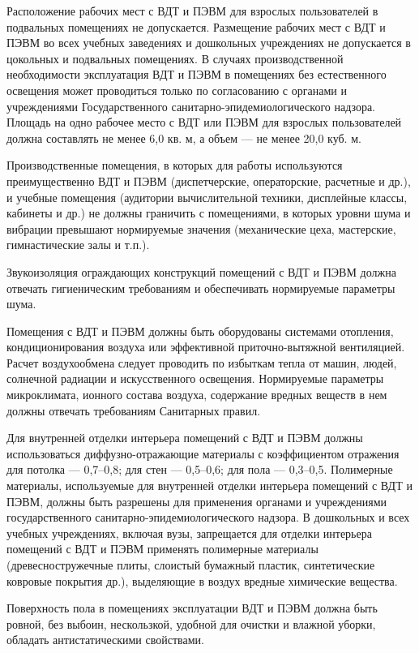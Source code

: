 Расположение рабочих мест с ВДТ и ПЭВМ для взрослых пользователей в подвальных помещениях не допускается. Размещение рабочих мест с ВДТ и ПЭВМ во всех учебных заведениях и дошкольных учреждениях не допускается в цокольных и подвальных помещениях. В случаях производственной необходимости эксплуатация ВДТ и ПЭВМ в помещениях без естественного освещения может проводиться только по согласованию с органами и учреждениями Государственного санитарно-эпидемиологического надзора.
Площадь на одно рабочее место с ВДТ или ПЭВМ для взрослых пользователей должна составлять не менее 6,0 кв. м, а объем --- не менее 20,0 куб. м.

Производственные помещения, в которых для работы используются преимущественно ВДТ и ПЭВМ (диспетчерские, операторские, расчетные и др.), и учебные помещения (аудитории вычислительной техники, дисплейные классы, кабинеты и др.) не должны граничить с помещениями, в которых уровни шума и вибрации превышают нормируемые значения (механические цеха, мастерские, гимнастические залы и т.п.).

Звукоизоляция ограждающих конструкций помещений с ВДТ и ПЭВМ должна отвечать гигиеническим требованиям и обеспечивать нормируемые параметры шума.

Помещения с ВДТ и ПЭВМ должны быть оборудованы системами отопления, кондиционирования воздуха или эффективной приточно-вытяжной вентиляцией. Расчет воздухообмена следует проводить по избыткам тепла от машин, людей, солнечной радиации и искусственного освещения. Нормируемые параметры микроклимата, ионного состава воздуха, содержание вредных веществ в нем должны отвечать требованиям Санитарных правил.

Для внутренней отделки интерьера помещений с ВДТ и ПЭВМ должны использоваться диффузно-отражающие материалы с коэффициентом отражения для потолка --- 0,7--0,8; для стен --- 0,5--0,6; для пола --- 0,3--0,5. Полимерные материалы, используемые для внутренней отделки интерьера помещений с ВДТ и ПЭВМ, должны быть разрешены для применения органами и учреждениями государственного санитарно-эпидемиологического надзора. В дошкольных и всех учебных учреждениях, включая вузы, запрещается для отделки интерьера помещений с ВДТ и ПЭВМ применять полимерные материалы (древесностружечные плиты, слоистый бумажный пластик, синтетические ковровые покрытия др.), выделяющие в воздух вредные химические вещества.

Поверхность пола в помещениях эксплуатации ВДТ и ПЭВМ должна быть ровной, без выбоин, нескользкой, удобной для очистки и влажной уборки, обладать антистатическими свойствами.

